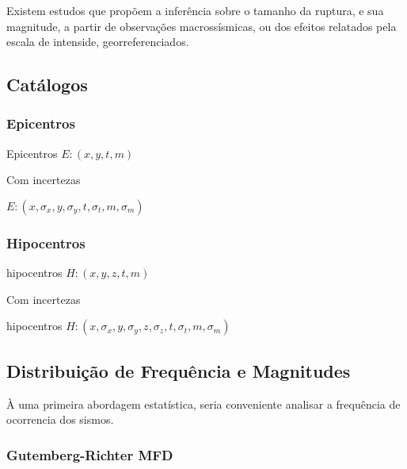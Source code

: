 Existem estudos \citep{bakun_1999} que propõem a inferência sobre o tamanho da ruptura, e sua
magnitude, a partir de observações macrossísmicas, ou dos efeitos relatados pela escala de intenside, georreferenciados.



\subsection{Catálogos}
\label{sec:catalogos}


\subsubsection{Epicentros}
\label{sec:fundamentos}

Epicentros $ E : {(x,y,t,m)}$

Com incertezas

$ E : {(x,\sigma_x,y,\sigma_y,t,\sigma_t,m,\sigma_m)}$


\subsubsection{Hipocentros}
\label{sec:fundamentos}

hipocentros $ H : {(x,y,z,t,m)}$

Com incertezas

hipocentros $ H : {(x,\sigma_x,y,\sigma_y,z,\sigma_z,t,\sigma_t,m,\sigma_m)}$


\subsection{Distribuição de Frequência e Magnitudes}
\label{sec:risco_sismico}

À uma primeira abordagem estatística, seria conveniente analisar a frequência de
ocorrencia dos sismos.

\subsubsection{Gutemberg-Richter MFD}
\label{sec:risco_sismico}

